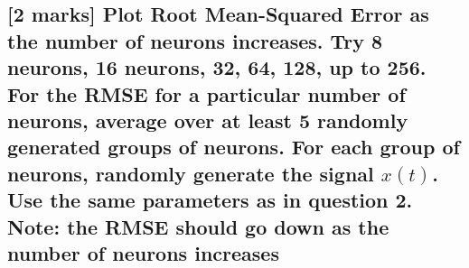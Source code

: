 \documentclass{article}
\begin{document}
\subsection{{[}2 marks{]} Plot Root Mean-Squared Error as the number of
neurons increases. Try 8 neurons, 16 neurons, 32, 64, 128, up to 256.
For the RMSE for a particular number of neurons, average over at least 5
randomly generated groups of neurons. For each group of neurons,
randomly generate the signal $x(t)$. Use the same parameters as in
question 2. Note: the RMSE should go down as the number of neurons
increases}\label{marks-plot-root-mean-squared-error-as-the-number-of-neurons-increases.-try-8-neurons-16-neurons-32-64-128-up-to-256.-for-the-rmse-for-a-particular-number-of-neurons-average-over-at-least-5-randomly-generated-groups-of-neurons.-for-each-group-of-neurons-randomly-generate-the-signal-xt.-use-the-same-parameters-as-in-question-2.-note-the-rmse-should-go-down-as-the-number-of-neurons-increases}
\end{document}

